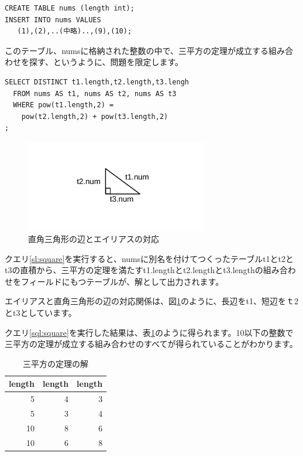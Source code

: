 \begin{lstlisting}[caption=整数テーブル,label=sql:int]
CREATE TABLE nums (length int);
INSERT INTO nums VALUES
   (1),(2),..(中略)..,(9),(10);
\end{lstlisting}

このテーブル、numsに格納された整数の中で、三平方の定理が成立する組み合わせを探す、というように、問題を限定します。

\begin{lstlisting}[caption=三平方の定理の解,label=sql:square]
SELECT DISTINCT t1.length,t2.length,t3.lengh 
  FROM nums AS t1, nums AS t2, nums AS t3
  WHERE pow(t1.length,2) = 
    pow(t2.length,2) + pow(t3.length,2) 
;
\end{lstlisting}

\begin{figure}[htbp]
  \includegraphics[width=8cm,pagebox=cropbox]{draw/fig1.pdf}
  \caption{直角三角形の辺とエイリアスの対応}
  \label{fig:triangle}
\end{figure}

クエリ\ref{sl:square}を実行すると、numsに別名を付けてつくったテーブルt1とt2とt3の直積から、三平方の定理を満たすt1.lengthとt2.lengthとt3.lengthの組み合わせをフィールドにもつテーブルが、解として出力されます。

エイリアスと直角三角形の辺の対応関係は、図\ref{fig:triangle}のように、長辺をt1、短辺をｔ2とt3としています。

クエリ\ref{sql:square}を実行した結果は、表\ref{table:square}のように得られます。10以下の整数で三平方の定理が成立する組み合わせのすべてが得られていることがわかります。

\begin{table}[htbp]
  \begin{tabular}{|r|r|r|} \hline
    length & length & length \\ \hline \hline  
    5 & 4 & 3 \\
    5 & 3 & 4 \\
    10 & 8 & 6 \\
    10 & 6 & 8 \\ \hline
  \end{tabular}
  \caption{三平方の定理の解}
  \label{table:square}
\end{table}


